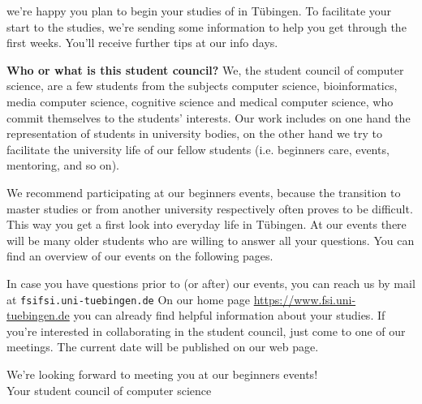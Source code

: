 we're happy you plan to begin your studies of \studiengang in Tübingen.
To facilitate your start to the studies, we're sending some information to help you get through the first weeks.
You'll receive further tips at our info days.

\textbf{Who or what is this \glqq student council\grqq?} We, the student council of computer science, are a few students from the subjects computer science, bioinformatics, media computer science, cognitive science and medical computer science, who commit themselves to the students' interests. Our work includes on one hand the representation of students in university bodies, on the other hand we try to facilitate the university life of our fellow students (i.e. beginners care,
events, mentoring, and so on).

\ifmaster
    \ifml
We recommend participating at our beginners events, because the transition to master studies or from another university respectively often proves to be difficult. This way you get a first look into everyday life in Tübingen.
    \fi
\fi 
At our events there will be many older students who are willing to answer all your questions. You can find an overview of our events on the following pages.

In case you have questions prior to (or after) our events, you can reach us by mail at \texttt{fsi\At fsi.uni-tuebingen.de}
On our home page
\url{https://www.fsi.uni-tuebingen.de} you can already find helpful information about your studies. If you're interested in collaborating in the student council, just come to one of our meetings. The current date will be published on our web page.

We're looking forward to meeting you at our beginners events!\\
Your student council of computer science
\vfill

\noindent{}
